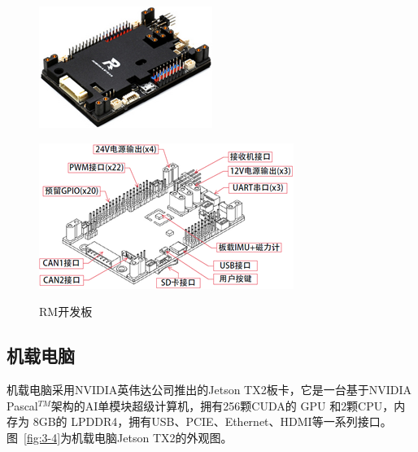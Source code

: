 \clearpage
\begin{figure}[htb]
	\centering
	\begin{minipage}[t]{0.4\linewidth} 
		\centering
		\includegraphics[width=1\columnwidth]{figures/3-3a.png} 
		\label{fig:3-3a}
	\end{minipage}
	
	\begin{minipage}[t]{0.6\linewidth} 
		\centering
		\includegraphics[width=1\columnwidth]{figures/3-3b.png} 
		\label{fig:3-3b} 
	\end{minipage}
	\caption{RM开发板~}
	\label{fig:3-3}
\end{figure}

\subsection{机载电脑}
机载电脑采用NVIDIA英伟达公司推出的Jetson TX2板卡，它是一台基于NVIDIA Pascal$^{TM}$架构的AI单模块超级计算机，拥有256颗CUDA的 GPU 和2颗CPU，内存为 8GB的 LPDDR4，拥有USB、PCIE、Ethernet、HDMI等一系列接口。图~\ref{fig:3-4}为机载电脑Jetson TX2的外观图。

